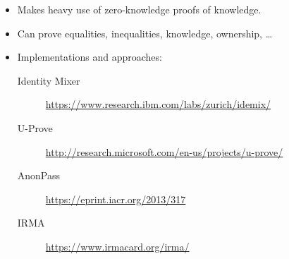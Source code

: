 \begin{frame}
  \begin{example}
    \begin{itemize}
      \item Makes heavy use of zero-knowledge proofs of knowledge.
      \item Can prove equalities, inequalities, knowledge, ownership, \dots
      \item Implementations and approaches:
        \begin{description}
          \item[Identity Mixer]
            \url{https://www.research.ibm.com/labs/zurich/idemix/}
          \item[U-Prove]
            \url{http://research.microsoft.com/en-us/projects/u-prove/}
          \item[AnonPass]
            \url{https://eprint.iacr.org/2013/317}
          \item[IRMA]
            \url{https://www.irmacard.org/irma/}
        \end{description}
    \end{itemize}
  \end{example}
\end{frame}




\begin{frame}[allowframebreaks]
	\small
  \printbibliography{}
\end{frame}

